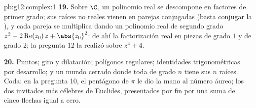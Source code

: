 \begin{solution}{pb:g12:complex:1}
\textbf{19.} Sobre $\C$, un polinomio real se descompone en factores de
primer grado; sus raíces no reales vienen en parejas conjugadas (basta
conjugar la ), y cada pareja se multiplica dando un polinomio real
de segundo grado $z^2 - 2\operatorname{Re}(z_0)\,z + \abs{z_0}^2$: de ahí
la factorización real en piezas de grado $1$ y de grado $2$; la pregunta 12
la realizó sobre $z^4 + 4$.

\textbf{20.} Puntos; giro y dilatación; polígonos regulares; identidades
trigonométricas por desarrollo; y un mundo cerrado donde toda  de
grado $n$ tiene sus $n$ raíces. Coda: en la pregunta 10, el pentágono de
$\pi$ le dio la mano al número áureo; los dos invitados más célebres de
Euclides, presentados por fin por una suma de cinco flechas igual a cero.
\end{solution}
